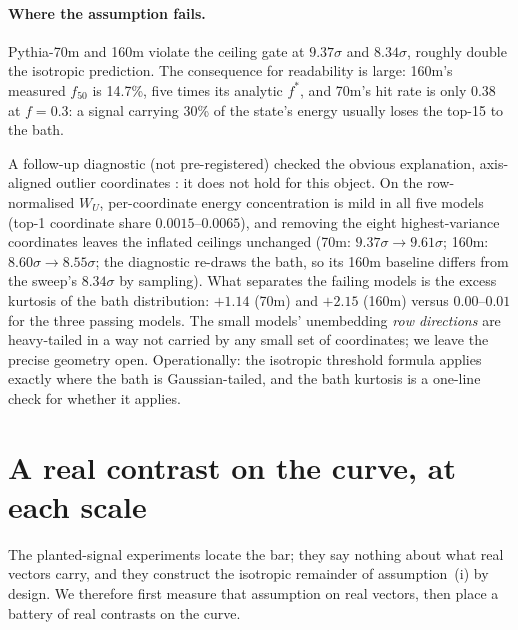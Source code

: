 \documentclass[11pt]{article}
\newcommand{\WU}{W_U}
\newcommand{\fstar}{f^{*}}
\begin{document}
\paragraph{Where the assumption fails.} Pythia-70m and 160m violate
the ceiling gate at $9.37\sigma$ and $8.34\sigma$, roughly double the
isotropic prediction. The consequence for readability is large: 160m's
measured $f_{50}$ is 14.7\%, five times its analytic $\fstar$, and
70m's hit rate is only 0.38 at $f = 0.3$: a signal carrying 30\% of
the state's energy usually loses the top-15 to the bath.

A follow-up diagnostic (not pre-registered) checked the obvious
explanation, axis-aligned outlier coordinates
\citep{timkey2021,puccetti2022}: it does not hold for this object. On
the row-normalised $\WU$, per-coordinate energy concentration is mild
in all five models (top-1 coordinate share $0.0015$--$0.0065$), and
removing the eight highest-variance coordinates leaves the inflated
ceilings unchanged (70m: $9.37\sigma \to 9.61\sigma$; 160m:
$8.60\sigma \to 8.55\sigma$; the diagnostic re-draws the bath, so its
160m baseline differs from the sweep's $8.34\sigma$ by sampling). What separates the failing models is
the excess kurtosis of the bath distribution: $+1.14$ (70m) and
$+2.15$ (160m) versus $0.00$--$0.01$ for the three passing models.
The small models' unembedding \emph{row directions} are heavy-tailed
in a way not carried by any small set of coordinates; we leave the
precise geometry open. Operationally: the isotropic threshold formula
applies exactly where the bath is Gaussian-tailed, and the bath
kurtosis is a one-line check for whether it applies.

\section{A real contrast on the curve, at each scale}
\label{sec:anchor}

The planted-signal experiments locate the bar; they say nothing about
what real vectors carry, and they construct the isotropic remainder
of assumption~(i) by design. We therefore first measure that
assumption on real vectors, then place a battery of real contrasts on
the curve.
\end{document}
